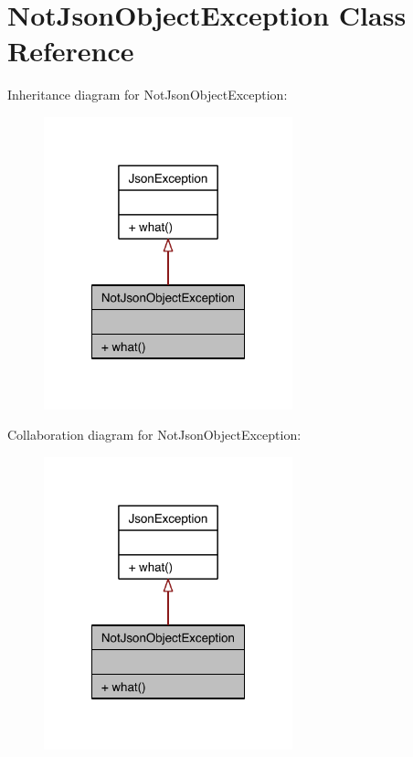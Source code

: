 \hypertarget{class_not_json_object_exception}{\section{Not\-Json\-Object\-Exception Class Reference}
\label{class_not_json_object_exception}
}


Inheritance diagram for Not\-Json\-Object\-Exception\-:\nopagebreak
\begin{figure}[H]
\begin{center}
\leavevmode
\includegraphics[width=204pt]{class_not_json_object_exception__inherit__graph}
\end{center}
\end{figure}


Collaboration diagram for Not\-Json\-Object\-Exception\-:\nopagebreak
\begin{figure}[H]
\begin{center}
\leavevmode
\includegraphics[width=204pt]{class_not_json_object_exception__coll__graph}
\end{center}
\end{figure}
